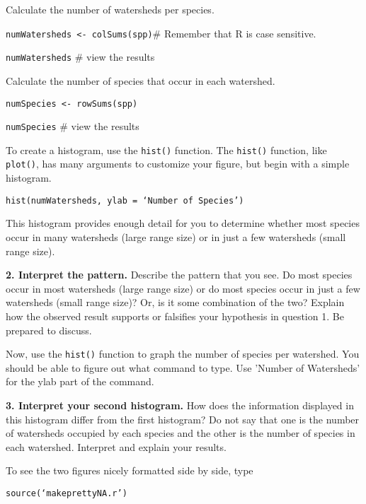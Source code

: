 \documentclass[11pt]{article}
\begin{document}
Calculate the number of watersheds per species.

\texttt{numWatersheds \textless{}- colSums(spp)}\qquad \# Remember that R is case
sensitive.

\texttt{numWatersheds} \qquad \# view the results

Calculate the number of species that occur in each watershed.

\texttt{numSpecies \textless{}- rowSums(spp)}

\texttt{numSpecies} \qquad \# view the results

To create a histogram, use the \texttt{hist()} function. The
\texttt{hist()} function, like \texttt{plot()}, has many arguments to
customize your figure, but begin with a simple histogram.

\texttt{hist(numWatersheds, ylab = ‘Number of Species’)}

This histogram provides enough detail for you to determine whether most
species occur in many watersheds (large range size) or in just a few
watersheds (small range size).

\textbf{2. Interpret the pattern.} Describe the pattern that you see. Do most
species occur in most watersheds (large range size) or do most species
occur in just a few watersheds (small range size)? Or, is it some
combination of the two? Explain how the observed result supports or
falsifies your hypothesis in question 1. Be prepared to discuss.

\vspace{6\baselineskip}

Now, use the \texttt{hist()} function to graph the number of species per
watershed. You should be able to figure out what command to type. Use 'Number 
of Watersheds' for the ylab part of the command.

\textbf{3. Interpret your second histogram.} How does the information displayed
in this histogram differ from the first histogram? Do not say that
one is the number of watersheds occupied by each species and the other
is the number of species in each watershed. Interpret and explain your results.

\vspace{6\baselineskip}

To see the two figures nicely formatted side by side, type


\texttt{source(‘makeprettyNA.r’)}
\end{document}
